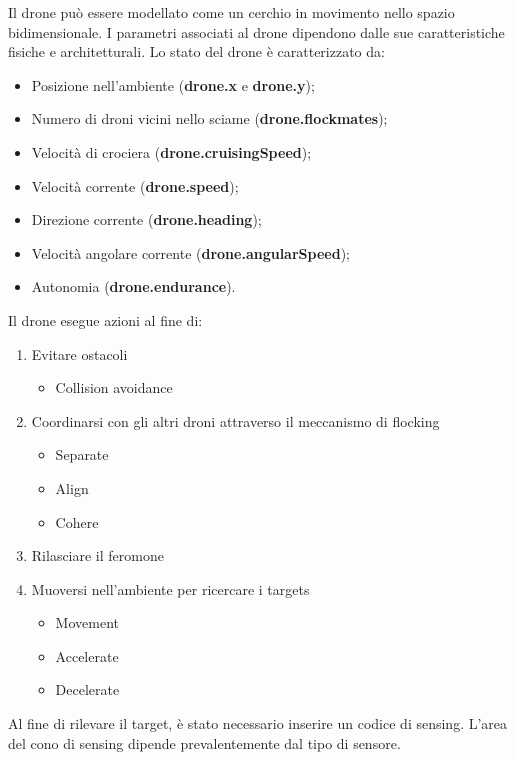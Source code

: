 Il drone può essere modellato come un cerchio in movimento nello spazio bidimensionale. 
I parametri associati al drone dipendono dalle sue caratteristiche fisiche e architetturali. 
Lo stato del drone è caratterizzato da:

\begin{itemize}
    \item Posizione nell’ambiente (\textbf{drone.x} e \textbf{drone.y});
    \item Numero di droni vicini nello sciame (\textbf{drone.flockmates});
    \item Velocità di crociera (\textbf{drone.cruisingSpeed});
    \item Velocità corrente (\textbf{drone.speed});
    \item Direzione corrente (\textbf{drone.heading});
    \item Velocità angolare corrente (\textbf{drone.angularSpeed});
    \item Autonomia (\textbf{drone.endurance}).
\end{itemize}
Il drone esegue azioni al fine di:

\begin{enumerate}
    \item Evitare ostacoli
    \begin{itemize}
        \item Collision avoidance
    \end{itemize}
    \item Coordinarsi con gli altri droni attraverso il meccanismo di flocking
    \begin{itemize}
        \item Separate
        \item Align
        \item Cohere
    \end{itemize}
    \item Rilasciare il feromone
    \item Muoversi nell’ambiente per ricercare i targets
    \begin{itemize}
        \item Movement
        \item Accelerate
        \item Decelerate
    \end{itemize}
\end{enumerate}

Al fine di rilevare il target, è stato necessario inserire un codice di sensing. L’area del cono di sensing dipende prevalentemente dal tipo di sensore. 

